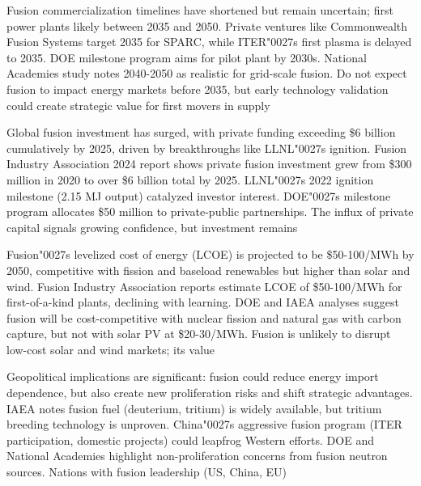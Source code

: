 \documentclass[10pt,a4paper]{article}
\newcommand{\BOApos}{{\BOQuoteFont\char"0027}}
\begin{document}
\begin{minipage}[t]{0.46\linewidth}
{\small Fusion commercialization timelines have shortened but remain uncertain; first power plants likely between 2035 and 2050. Private ventures like Commonwealth Fusion Systems target 2035 for SPARC, while ITER\BOApos{}s first plasma is delayed to 2035. DOE milestone program aims for pilot plant by 2030s. National Academies study notes 2040-2050 as realistic for grid-scale fusion. Do not expect fusion to impact energy markets before 2035, but early technology validation could create strategic value for first movers in supply}\par
{\small Global fusion investment has surged, with private funding exceeding \$6 billion cumulatively by 2025, driven by breakthroughs like LLNL\BOApos{}s ignition. Fusion Industry Association 2024 report shows private fusion investment grew from \$300 million in 2020 to over \$6 billion total by 2025. LLNL\BOApos{}s 2022 ignition milestone (2.15 MJ output) catalyzed investor interest. DOE\BOApos{}s milestone program allocates \$50 million to private-public partnerships. The influx of private capital signals growing confidence, but investment remains}\par
\end{minipage}\hfill\begin{minipage}[t]{0.46\linewidth}
{\small Fusion\BOApos{}s levelized cost of energy (LCOE) is projected to be \$50-100/MWh by 2050, competitive with fission and baseload renewables but higher than solar and wind. Fusion Industry Association reports estimate LCOE of \$50-100/MWh for first-of-a-kind plants, declining with learning. DOE and IAEA analyses suggest fusion will be cost-competitive with nuclear fission and natural gas with carbon capture, but not with solar PV at \$20-30/MWh. Fusion is unlikely to disrupt low-cost solar and wind markets; its value}\par
{\small Geopolitical implications are significant: fusion could reduce energy import dependence, but also create new proliferation risks and shift strategic advantages. IAEA notes fusion fuel (deuterium, tritium) is widely available, but tritium breeding technology is unproven. China\BOApos{}s aggressive fusion program (ITER participation, domestic projects) could leapfrog Western efforts. DOE and National Academies highlight non-proliferation concerns from fusion neutron sources. Nations with fusion leadership (US, China, EU)}\par
\end{minipage}
\end{document}
